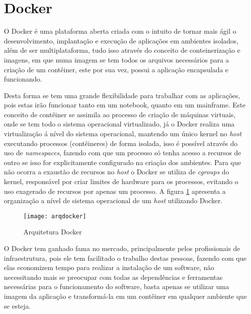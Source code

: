 \section{Docker}
\label{sec:docker}
O Docker é uma plataforma aberta criada com o intuito de tornar mais ágil o desenvolvimento, implantação e execução de aplicações em ambientes isolados, além de ser multiplataforma, tudo isso através do conceito de conteinerização e imagens, em que numa imagem se tem todos os arquivos necessários para a criação de um contêiner, este por sua vez, possui a aplicação encapsulada  e funcionando.

Desta forma se tem uma grande flexibilidade para trabalhar com as aplicações, pois estas irão funcionar tanto em um notebook, quanto em um mainframe. Este conceito de contêiner se assimila ao processo de criação de máquinas virtuais, onde se tem todo o sistema operacional virtualizado, já o Docker realiza uma virtualização á nível do sistema operacional, mantendo um único kernel no \textit{host} executando processos (contêineres) de forma isolada, isso é possível através do uso de \textit{namespaces}, fazendo com que um processo só tenha acesso a recursos de outro se isso for explicitamente configurado na criação dos ambientes. Para que não ocorra a exaustão de recursos no \textit{host} o Docker se utiliza de \textit{cgroups} do kernel, responsável por criar limites de hardware para os processos, evitando o uso exagerado de recursos por apenas um processo. A figura \ref{fig:arqdocker} apresenta a organização a nível de sistema operacional de um \textit{host} utilizando Docker.~\cite{docker}

\begin{figure}[!h]
\caption{\label{fig:arqdocker} Arquitetura Docker}
\begin{center}
\texttt{[image: arqdocker]}
\end{center}
\end{figure}

O Docker tem ganhado fama no mercado, principalmente pelos profissionais de infraestrutura, pois ele tem facilitado o trabalho destas pessoas, fazendo com que elas economizem tempo para realizar a instalação de um software, não necessitando mais se preocupar com todas as dependências e ferramentas necessárias para o funcionamento do software, basta apenas se utilizar uma imagem da aplicação e transformá-la em um contêiner em qualquer ambiente que se esteja.

